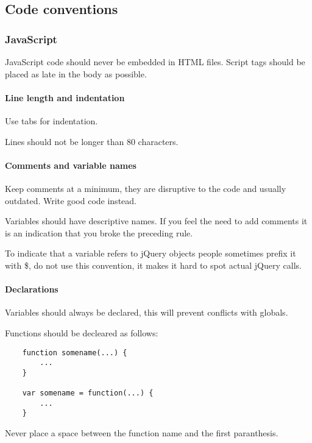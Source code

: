 \subsection{Code conventions}

\subsubsection{JavaScript}

JavaScript code should never be embedded in HTML files. Script tags should be
placed as late in the body as possible. \cite{crockford:code}

\paragraph{Line length and indentation}

Use tabs for indentation. 

Lines should not be longer than 80 characters.

\paragraph{Comments and variable names}

Keep comments at a minimum, they are disruptive to the code and
usually outdated. Write good code instead.

Variables should have descriptive names. If you feel the need to add comments
it is an indication that you broke the preceding rule.

To indicate that a variable refers to jQuery objects people sometimes prefix it
with \$, do not use this convention, it makes it hard to spot actual jQuery
calls.

\paragraph{Declarations}

Variables should always be declared, this will prevent conflicts with globals.

Functions should be decleared as follows:

\begin{lstlisting}
	function somename(...) {
		...
	}

	var somename = function(...) {
		...
	}
\end{lstlisting}

Never place a space between the function name and the first paranthesis.


